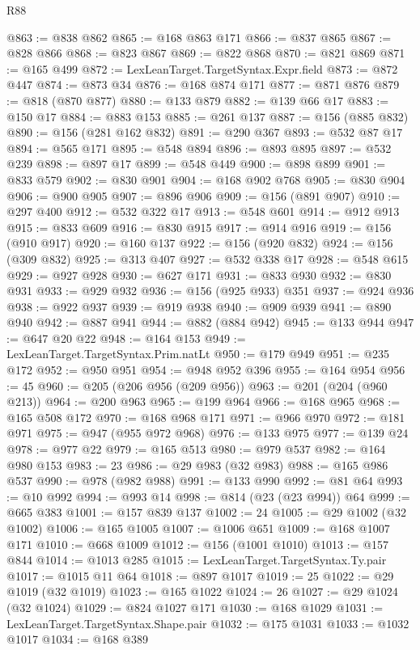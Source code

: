 \begin{lexlean}{R88}
\begin{coremodule}
@863 := @838 @862
@865 := @168 @863 @171
@866 := @837 @865
@867 := @828 @866
@868 := @823 @867
@869 := @822 @868
@870 := @821 @869
@871 := @165 @499
@872 := LexLeanTarget.TargetSyntax.Expr.field
@873 := @872 @447
@874 := @873 @34
@876 := @168 @874 @171
@877 := @871 @876
@879 := @818 (@870 @877)
@880 := @133 @879
@882 := @139 @66 @17
@883 := @150 @17
@884 := @883 @153
@885 := @261 @137
@887 := @156 (@885 @832)
@890 := @156 (@281 @162 @832)
@891 := @290 @367
@893 := @532 @87 @17
@894 := @565 @171
@895 := @548 @894
@896 := @893 @895
@897 := @532 @239
@898 := @897 @17
@899 := @548 @449
@900 := @898 @899
@901 := @833 @579
@902 := @830 @901
@904 := @168 @902 @768
@905 := @830 @904
@906 := @900 @905
@907 := @896 @906
@909 := @156 (@891 @907)
@910 := @297 @400
@912 := @532 @322 @17
@913 := @548 @601
@914 := @912 @913
@915 := @833 @609
@916 := @830 @915
@917 := @914 @916
@919 := @156 (@910 @917)
@920 := @160 @137
@922 := @156 (@920 @832)
@924 := @156 (@309 @832)
@925 := @313 @407
@927 := @532 @338 @17
@928 := @548 @615
@929 := @927 @928
@930 := @627 @171
@931 := @833 @930
@932 := @830 @931
@933 := @929 @932
@936 := @156 (@925 @933) @351
@937 := @924 @936
@938 := @922 @937
@939 := @919 @938
@940 := @909 @939
@941 := @890 @940
@942 := @887 @941
@944 := @882 (@884 @942)
@945 := @133 @944
@947 := @647 @20 @22
@948 := @164 @153
@949 := LexLeanTarget.TargetSyntax.Prim.natLt
@950 := @179 @949
@951 := @235 @172
@952 := @950 @951
@954 := @948 @952 @396
@955 := @164 @954
@956 := 45
@960 := @205 (@206 @956 (@209 @956))
@963 := @201 (@204 (@960 @213))
@964 := @200 @963
@965 := @199 @964
@966 := @168 @965
@968 := @165 @508 @172
@970 := @168 @968 @171
@971 := @966 @970
@972 := @181 @971
@975 := @947 (@955 @972 @968)
@976 := @133 @975
@977 := @139 @24
@978 := @977 @22
@979 := @165 @513
@980 := @979 @537
@982 := @164 @980 @153
@983 := 23
@986 := @29 @983 (@32 @983)
@988 := @165 @986 @537
@990 := @978 (@982 @988)
@991 := @133 @990
@992 := @81 @64
@993 := @10 @992
@994 := @993 @14
@998 := @814 (@23 (@23 @994)) @64
@999 := @665 @383
@1001 := @157 @839 @137
@1002 := 24
@1005 := @29 @1002 (@32 @1002)
@1006 := @165 @1005
@1007 := @1006 @651
@1009 := @168 @1007 @171
@1010 := @668 @1009
@1012 := @156 (@1001 @1010)
@1013 := @157 @844
@1014 := @1013 @285
@1015 := LexLeanTarget.TargetSyntax.Ty.pair
@1017 := @1015 @11 @64
@1018 := @897 @1017
@1019 := 25
@1022 := @29 @1019 (@32 @1019)
@1023 := @165 @1022
@1024 := 26
@1027 := @29 @1024 (@32 @1024)
@1029 := @824 @1027 @171
@1030 := @168 @1029
@1031 := LexLeanTarget.TargetSyntax.Shape.pair
@1032 := @175 @1031
@1033 := @1032 @1017
@1034 := @168 @389

\end{coremodule}
\end{lexlean}
